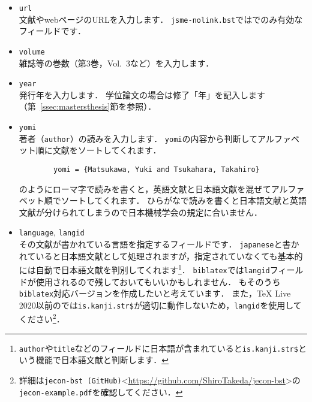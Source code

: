 \documentclass[a4paper,fleqn,uplatex,dvipdfmx]{jsarticle}
\newcommand{\jsmefile}{\texttt{jsme-nolink.bst}}
\begin{document}
\begin{itemize}
    \item \verb|url| \\
        文献やwebページのURLを入力します．
        \jsmefile では\ttonline でのみ有効なフィールドです．
    \item \verb|volume| \\
        雑誌等の巻数（第3巻，Vol.~3など）を入力します．
    \item \verb|year| \\
        発行年を入力します．
        学位論文の場合は修了「年」を記入します（第~\ref{ssec:mastersthesis}節\ttmastersthesis を参照）．
    \item \verb|yomi| \\
        著者（\verb|author|）の読みを入力します．
        \verb|yomi|の内容から判断してアルファベット順に文献をソートしてくれます．
        \begin{verbatim}
        yomi = {Matsukawa, Yuki and Tsukahara, Takahiro}
        \end{verbatim}
        のようにローマ字で読みを書くと，英語文献と日本語文献を混ぜてアルファベット順でソートしてくれます．
        ひらがなで読みを書くと日本語文献と英語文献が分けられてしまうので日本機械学会の規定に合いません．
    \item \verb|language|, \verb|langid| \\
        その文献が書かれている言語を指定するフィールドです．
        \verb|japanese|と書かれていると日本語文献として処理されますが，指定されていなくても基本的には自動で日本語文献を判別してくれます\footnote{\texttt{author}や\texttt{title}などのフィールドに日本語が含まれていると\texttt{is.kanji.str\$}という機能で日本語文献と判断します．}．
        \verb|biblatex|では\verb|langid|フィールドが使用されるので残しておいてもいいかもしれません．
        \JSMErepos もそのうち\verb|biblatex|対応バージョンを作成したいと考えています．
        また，TeX Live 2020以前の\upBibTeX{}では\verb|is.kanji.str$|が適切に動作しないため，\verb|langid|を使用してください\footnote{詳細は\verb|jecon-bst (GitHub)|\textless \url{https://github.com/ShiroTakeda/jecon-bst}\textgreater の\verb|jecon-example.pdf|を確認してください．}．
\end{itemize}
\end{document}
